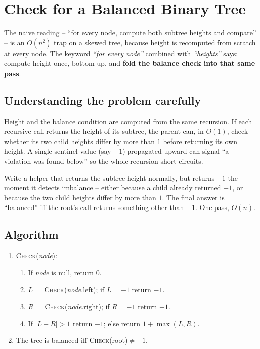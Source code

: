 \section{Check for a Balanced Binary Tree}
\label{sec:trees-balanced}


\begin{patternbox}
The naive reading -- ``for every node, compute both subtree heights and
compare'' -- is an $O(n^2)$ trap on a skewed tree, because height is
recomputed from scratch at every node. The keyword \emph{``for every
node''} combined with \emph{``heights''} says: compute height once,
bottom-up, and \textbf{fold the balance check into that same pass}.
\end{patternbox}

\subsection*{Understanding the problem carefully}

Height and the balance condition are computed from the same recursion. If
each recursive call returns the height of its subtree, the parent can, in
$O(1)$, check whether its two child heights differ by more than $1$ before
returning its own height. A single sentinel value (say $-1$) propagated
upward can signal ``a violation was found below'' so the whole recursion
short-circuits.

\begin{ideabox}
Write a helper that returns the subtree height normally, but returns $-1$
the moment it detects imbalance -- either because a child already returned
$-1$, or because the two child heights differ by more than $1$. The final
answer is ``balanced'' iff the root's call returns something other than
$-1$. One pass, $O(n)$.
\end{ideabox}

\subsection*{Algorithm}

\begin{enumerate}
  \item \textsc{Check}(\textit{node}):
  \begin{enumerate}
    \item If \textit{node} is null, return $0$.
    \item $L = $ \textsc{Check}(\textit{node}.left); if $L=-1$ return
          $-1$.
    \item $R = $ \textsc{Check}(\textit{node}.right); if $R=-1$ return
          $-1$.
    \item If $|L-R|>1$ return $-1$; else return $1+\max(L,R)$.
  \end{enumerate}
  \item The tree is balanced iff \textsc{Check}(root)$\ne -1$.
\end{enumerate}

